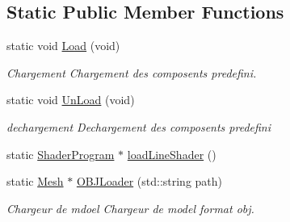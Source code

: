 \subsection*{Static Public Member Functions}
\begin{DoxyCompactItemize}
\item 
static void \mbox{\hyperlink{class_beer_engine_1_1_graphics_1_1_graphics_a87ad2f3a98b4fa5fd453589f7f023701}{Load}} (void)
\begin{DoxyCompactList}\small\item\em Chargement Chargement des composents predefini. \end{DoxyCompactList}\item 
static void \mbox{\hyperlink{class_beer_engine_1_1_graphics_1_1_graphics_ab42d214b5a3f69614ad5b9c30d506619}{Un\+Load}} (void)
\begin{DoxyCompactList}\small\item\em dechargement Dechargement des composents predefini \end{DoxyCompactList}\item 
static \mbox{\hyperlink{class_beer_engine_1_1_graphics_1_1_shader_program}{Shader\+Program}} $\ast$ \mbox{\hyperlink{class_beer_engine_1_1_graphics_1_1_graphics_a385cbcbf514ef7c22cb4a0ed6f577908}{load\+Line\+Shader}} ()
\item 
static \mbox{\hyperlink{class_beer_engine_1_1_graphics_1_1_mesh}{Mesh}} $\ast$ \mbox{\hyperlink{class_beer_engine_1_1_graphics_1_1_graphics_a0b9081ae33ab8eb0a166c49f70d907ef}{O\+B\+J\+Loader}} (std\+::string path)
\begin{DoxyCompactList}\small\item\em Chargeur de mdoel Chargeur de model format obj. \end{DoxyCompactList}\end{DoxyCompactItemize}
